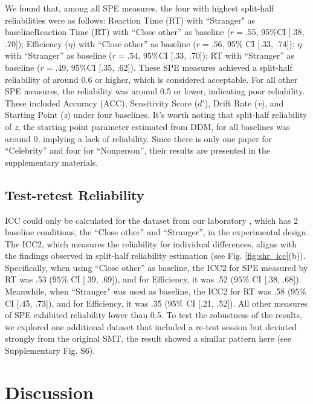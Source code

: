 \documentclass[sn-apa]{sn-jnl}%
\theoremstyle{thmstyleone}%
\theoremstyle{thmstyletwo}%
\theoremstyle{thmstylethree}%
\begin{document}
We found that, among all SPE measures, the four with highest split-half reliabilities were as follows: Reaction Time (RT) with ``Stranger" as baselineReaction Time (RT) with “Close other” as baseline ($r = .55$, 95\%CI [.38, .70]); Efficiency ($\eta$) with “Close other” as baseline ($r = .56$, 95\% CI [.33, .74]); $\eta$ with “Stranger” as baseline ($r = .54$, 95\%CI [.33, .70]); RT with “Stranger” as baseline ($r = .49$, 95\%CI [.35, .62]). These SPE measures achieved a split-half reliability of around 0.6 or higher, which is considered acceptable. For all other SPE measures, the reliability was around 0.5 or lower, indicating poor reliability. These included Accuracy (ACC), Sensitivity Score ($d'$), Drift Rate (\textit{v}), and Starting Point (\textit{z}) under four baselines. It's worth noting that split-half reliability of \textit{z}, the starting point parameter estimated from DDM, for all baselines was around 0, implying a lack of reliability. Since there is only one paper for ``Celebrity” and four for ``Nonperson”, their results are presented in the supplementary materials. 


\subsection{Test-retest Reliability}\label{subsec:testretest}

ICC could only be calculated for the dataset from our laboratory \parencite{hu2023data}, which has 2 baseline conditions, the ``Close other” and ``Stranger”, in the experimental design. The ICC2, which measures the reliability for individual differences, aligns with the findings observed in split-half reliability estimation (see Fig. \ref{fig:shr_icc}(b)). Specifically, when using ``Close other” as baseline, the ICC2 for SPE measured by RT was .53 ($95\%$ CI [.39, .69]), and for Efficiency, it was .52 ($95\%$ CI [.38, .68]). Meanwhile, when ``Stranger" was used as baseline, the ICC2 for RT was .58 ($95\%$ CI [.45, .73]), and for Efficiency, it was .35 ($95\%$ CI [.21, .52]). All other measures of SPE exhibited reliability lower than 0.5. To test the robustness of the results, we explored one additional dataset that included a re-test session but deviated strongly from the original SMT, the result showed a similar pattern here (see Supplementary Fig. S6).
\clearpage

\section{Discussion}\label{sec5}
\end{document}
